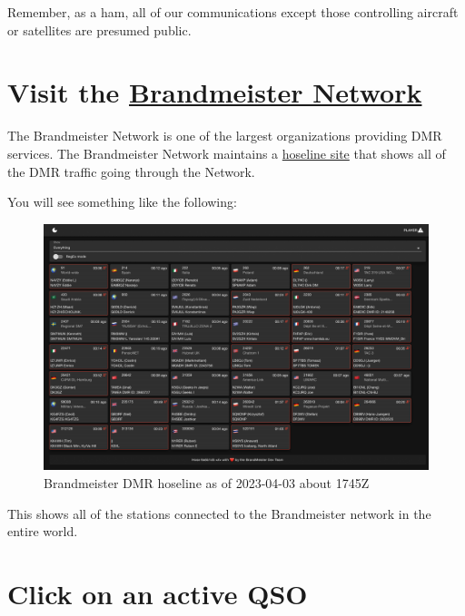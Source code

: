 \documentclass[
  letterpaper,
  DIV=11,
  numbers=noendperiod]{scrreport}
\begin{document}
Remember, as a ham, all of our communications except those controlling
aircraft or satellites are presumed public.

\hypertarget{visit-the-brandmeister-network}{%
\section*{\texorpdfstring{Visit the
\href{https://brandmeister.network}{Brandmeister
Network}}{Visit the Brandmeister Network}}\label{visit-the-brandmeister-network}}


The Brandmeister Network is one of the largest organizations providing
DMR services. The Brandmeister Network maintains a
\href{https://hose.brandmeister.network}{hoseline site} that shows all
of the DMR traffic going through the Network.

You will see something like the following:

\begin{figure}

{\centering \includegraphics[width=1\textwidth,height=\textheight]{include/img/brandmeister-hoseline-2023-04-03.png}

}

\caption{Brandmeister DMR hoseline as of 2023-04-03 about 1745Z}

\end{figure}

This shows all of the stations connected to the Brandmeister network in
the entire world.

\hypertarget{click-on-an-active-qso}{%
\section*{Click on an active QSO}\label{click-on-an-active-qso}}
\end{document}
